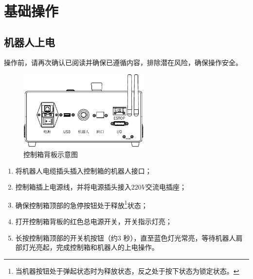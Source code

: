 \chapter{基础操作}
\label{cha:基础操作}

\section{机器人上电}

操作前，请再次确认已阅读并确保已遵循内容，排除潜在风险，确保操作安全。

\begin{figure}[hb]
    \centering
    \includegraphics[height=4cm]{line_graphs/robot_control_box_back.pdf}
    \caption{控制箱背板示意图}
    \label{fig:控制箱背板示意图}
\end{figure}

\begin{enumerate}
\item 将机器人电缆插头插入控制箱的机器人接口；
\item 控制箱插上电源线，并将电源插头接入$220 \unit{V}$交流电插座；
\item 确保控制箱顶部的急停按钮处于释放\footnote{当机器按钮处于弹起状态时为释放状态，反之处于按下状态为锁定状态。}状态；
\item 打开控制箱背板的红色总电源开关，开关指示灯亮；
\item 长按控制箱顶部的开关机按钮（约3 秒），直至蓝色灯光常亮，等待机器人肩部灯光亮起，完成控制箱和机器人的上电操作。
\end{enumerate}



